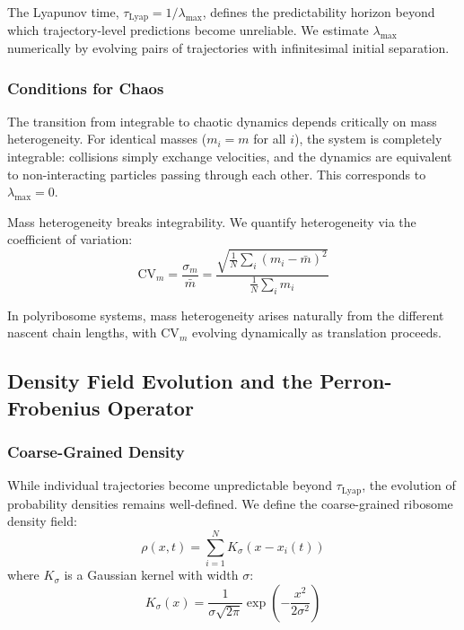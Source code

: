 \documentclass[11pt]{article}
\begin{document}
The Lyapunov time, $\tau_{\text{Lyap}} = 1/\lambda_{\max}$, defines the predictability horizon beyond which trajectory-level predictions become unreliable. We estimate $\lambda_{\max}$ numerically by evolving pairs of trajectories with infinitesimal initial separation.

\subsubsection{Conditions for Chaos}

The transition from integrable to chaotic dynamics depends critically on mass heterogeneity. For identical masses ($m_i = m$ for all $i$), the system is completely integrable: collisions simply exchange velocities, and the dynamics are equivalent to non-interacting particles passing through each other. This corresponds to $\lambda_{\max} = 0$.

Mass heterogeneity breaks integrability. We quantify heterogeneity via the coefficient of variation:
\begin{equation}
    \text{CV}_m = \frac{\sigma_m}{\bar{m}} = \frac{\sqrt{\frac{1}{N}\sum_i (m_i - \bar{m})^2}}{\frac{1}{N}\sum_i m_i}
\end{equation}

In polyribosome systems, mass heterogeneity arises naturally from the different nascent chain lengths, with $\text{CV}_m$ evolving dynamically as translation proceeds.

\subsection{Density Field Evolution and the Perron-Frobenius Operator}

\subsubsection{Coarse-Grained Density}

While individual trajectories become unpredictable beyond $\tau_{\text{Lyap}}$, the evolution of probability densities remains well-defined. We define the coarse-grained ribosome density field:
\begin{equation}
    \rho(x, t) = \sum_{i=1}^{N} K_\sigma(x - x_i(t))
\end{equation}
where $K_\sigma$ is a Gaussian kernel with width $\sigma$:
\begin{equation}
    K_\sigma(x) = \frac{1}{\sigma\sqrt{2\pi}} \exp\left(-\frac{x^2}{2\sigma^2}\right)
\end{equation}
\end{document}

